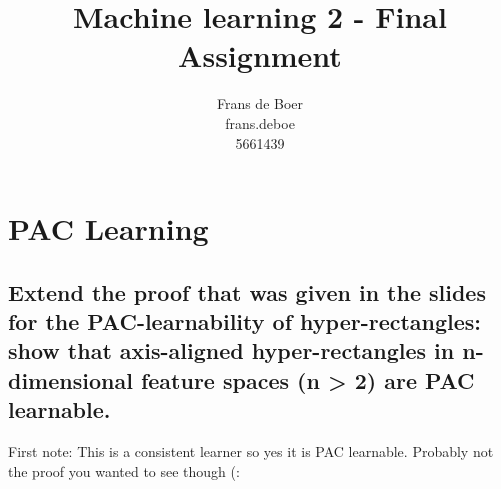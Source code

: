 \documentclass[11pt,a4paper]{article}
\author{
    Frans de Boer \\
    frans.deboe \\
    5661439 \\
}
\title{Machine learning 2 - Final Assignment}
\begin{document}


\section{PAC Learning}

\subsection{Extend the proof that was given in the slides for the PAC-learnability of hyper-rectangles:
show that axis-aligned hyper-rectangles in n-dimensional feature spaces (n > 2) are PAC
learnable.}

First note: This is a consistent learner so yes it is PAC learnable. Probably not the proof you wanted to see though (:

  
\end{document}
